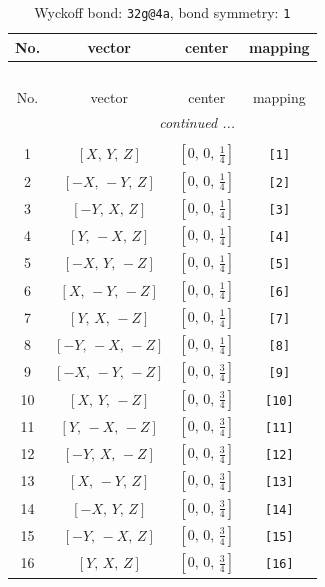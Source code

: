 \documentclass[fleqn,8pt]{jsarticle}
\begin{document}
\begin{longtable}{cccc}
\caption{Wyckoff bond: {\tt 32g@4a}, bond symmetry: {\tt 1}}
 \\
 \hline \hline
No. & vector & center & mapping \\ \hline \endfirsthead

\multicolumn{3}{l}{\tablename\ \thetable{}} \\
 \hline \hline
No. & vector & center & mapping \\ \hline \endhead

 \hline \hline
\multicolumn{3}{r}{\footnotesize\it continued ...} \\ \endfoot

 \hline \hline
\multicolumn{3}{r}{} \\ \endlastfoot

1 & $\left[ X,\, Y,\, Z \right]$ & $\left[ 0,\, 0,\, \frac{1}{4} \right]$ & {\tt [1]} \\ \hline
2 & $\left[ - X,\, - Y,\, Z \right]$ & $\left[ 0,\, 0,\, \frac{1}{4} \right]$ & {\tt [2]} \\ \hline
3 & $\left[ - Y,\, X,\, Z \right]$ & $\left[ 0,\, 0,\, \frac{1}{4} \right]$ & {\tt [3]} \\ \hline
4 & $\left[ Y,\, - X,\, Z \right]$ & $\left[ 0,\, 0,\, \frac{1}{4} \right]$ & {\tt [4]} \\ \hline
5 & $\left[ - X,\, Y,\, - Z \right]$ & $\left[ 0,\, 0,\, \frac{1}{4} \right]$ & {\tt [5]} \\ \hline
6 & $\left[ X,\, - Y,\, - Z \right]$ & $\left[ 0,\, 0,\, \frac{1}{4} \right]$ & {\tt [6]} \\ \hline
7 & $\left[ Y,\, X,\, - Z \right]$ & $\left[ 0,\, 0,\, \frac{1}{4} \right]$ & {\tt [7]} \\ \hline
8 & $\left[ - Y,\, - X,\, - Z \right]$ & $\left[ 0,\, 0,\, \frac{1}{4} \right]$ & {\tt [8]} \\ \hline
9 & $\left[ - X,\, - Y,\, - Z \right]$ & $\left[ 0,\, 0,\, \frac{3}{4} \right]$ & {\tt [9]} \\ \hline
10 & $\left[ X,\, Y,\, - Z \right]$ & $\left[ 0,\, 0,\, \frac{3}{4} \right]$ & {\tt [10]} \\ \hline
11 & $\left[ Y,\, - X,\, - Z \right]$ & $\left[ 0,\, 0,\, \frac{3}{4} \right]$ & {\tt [11]} \\ \hline
12 & $\left[ - Y,\, X,\, - Z \right]$ & $\left[ 0,\, 0,\, \frac{3}{4} \right]$ & {\tt [12]} \\ \hline
13 & $\left[ X,\, - Y,\, Z \right]$ & $\left[ 0,\, 0,\, \frac{3}{4} \right]$ & {\tt [13]} \\ \hline
14 & $\left[ - X,\, Y,\, Z \right]$ & $\left[ 0,\, 0,\, \frac{3}{4} \right]$ & {\tt [14]} \\ \hline
15 & $\left[ - Y,\, - X,\, Z \right]$ & $\left[ 0,\, 0,\, \frac{3}{4} \right]$ & {\tt [15]} \\ \hline
16 & $\left[ Y,\, X,\, Z \right]$ & $\left[ 0,\, 0,\, \frac{3}{4} \right]$ & {\tt [16]} \\
\end{longtable}
\end{document}
